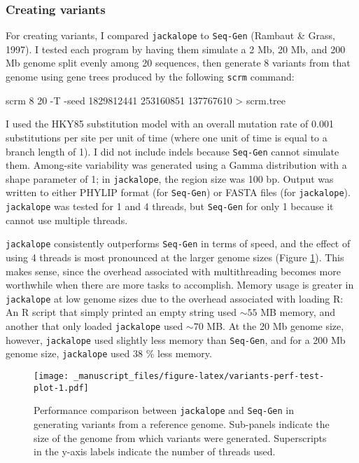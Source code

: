 \documentclass[12pt,]{article}
\newenvironment{Shaded}{}{}
\newcommand{\ExtensionTok}[1]{#1}
\newcommand{\NormalTok}[1]{#1}
\newcommand{\OperatorTok}[1]{#1}
\begin{document}
\hypertarget{creating-variants-1}{%
\subsubsection{Creating variants}\label{creating-variants-1}}

For creating variants, I compared \texttt{jackalope} to \texttt{Seq-Gen}
(Rambaut \& Grass, 1997).
I tested each program by having them simulate a 2 Mb, 20 Mb, and 200 Mb genome
split evenly among 20 sequences, then generate 8 variants from that genome using
gene trees produced by the following \texttt{scrm} command:

\begin{Shaded}
\begin{Highlighting}[]
\ExtensionTok{scrm}\NormalTok{ 8 20 -T -seed 1829812441 253160851 137767610 }\OperatorTok{>}\NormalTok{ scrm.tree}
\end{Highlighting}
\end{Shaded}

I used the HKY85 substitution model
with an overall mutation rate of 0.001 substitutions per site per unit of time
(where one unit of time is equal to a branch length of 1).
I did not include indels because \texttt{Seq-Gen} cannot simulate them.
Among-site variability was generated using a Gamma distribution with a shape
parameter of 1; in \texttt{jackalope}, the region size was 100 bp.
Output was written to either PHYLIP format (for \texttt{Seq-Gen}) or
FASTA files (for \texttt{jackalope}).
\texttt{jackalope} was tested for 1 and 4 threads, but
\texttt{Seq-Gen} for only 1 because it cannot use multiple threads.

\texttt{jackalope} consistently outperforms \texttt{Seq-Gen} in terms of speed, and the effect
of using 4 threads is most pronounced at the larger genome sizes
(Figure \ref{fig:variants-perf-test-plot}).
This makes sense, since the overhead associated with multithreading becomes more
worthwhile when there are more tasks to accomplish.
Memory usage is greater in \texttt{jackalope} at low genome sizes due to the overhead
associated with loading R:
An R script that simply printed an empty string used \(\sim 55\) MB memory,
and another that only loaded \texttt{jackalope} used \(\sim 70\) MB.
At the 20 Mb genome size, however, \texttt{jackalope} used slightly less memory than \texttt{Seq-Gen},
and for a 200 Mb genome size, \texttt{jackalope} used 38 \% less memory.

\begin{figure}
\centering
\texttt{[image: \_manuscript\_files/figure-latex/variants-perf-test-plot-1.pdf]}
\caption{\label{fig:variants-perf-test-plot}Performance comparison between \texttt{jackalope} and \texttt{Seq-Gen} in generating variants from a reference genome. Sub-panels indicate the size of the genome from which variants were generated. Superscripts in the y-axis labels indicate the number of threads used.}
\end{figure}
\end{document}
